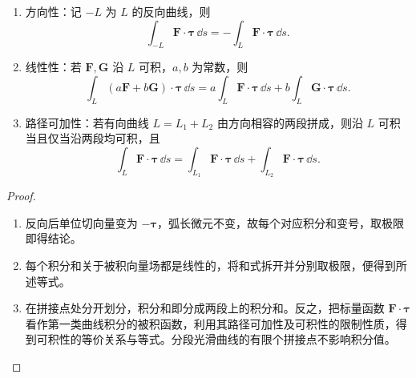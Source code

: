 \begin{proposition}
\begin{enumerate}
\item 方向性：记 $-L$ 为 $L$ 的反向曲线，则
\[
\int_{-L}\boldsymbol F\cdot\boldsymbol\tau\,\dd s
=-\int_L\boldsymbol F\cdot\boldsymbol\tau\,\dd s.
\]
\item 线性性：若 $\boldsymbol F,\boldsymbol G$ 沿 $L$ 可积，$a,b$ 为常数，则
\[
\int_L(a\boldsymbol F+b\boldsymbol G)\cdot\boldsymbol\tau\,\dd s
=a\int_L\boldsymbol F\cdot\boldsymbol\tau\,\dd s+b\int_L\boldsymbol G\cdot\boldsymbol\tau\,\dd s.
\]
\item 路径可加性：若有向曲线 $L=L_1+L_2$ 由方向相容的两段拼成，则沿 $L$ 可积当且仅当沿两段均可积，且
\[
\int_L\boldsymbol F\cdot\boldsymbol\tau\,\dd s
=\int_{L_1}\boldsymbol F\cdot\boldsymbol\tau\,\dd s+\int_{L_2}\boldsymbol F\cdot\boldsymbol\tau\,\dd s.
\]
\end{enumerate}
\end{proposition}
\begin{proof}
\begin{enumerate}
\item 反向后单位切向量变为 $-\boldsymbol\tau$，弧长微元不变，故每个对应积分和变号，取极限即得结论。
\item 每个积分和关于被积向量场都是线性的，将和式拆开并分别取极限，便得到所述等式。
\item 在拼接点处分开划分，积分和即分成两段上的积分和。反之，把标量函数 $\boldsymbol F\cdot\boldsymbol\tau$ 看作第一类曲线积分的被积函数，利用其路径可加性及可积性的限制性质，得到可积性的等价关系与等式。分段光滑曲线的有限个拼接点不影响积分值。
\end{enumerate}
\end{proof}

